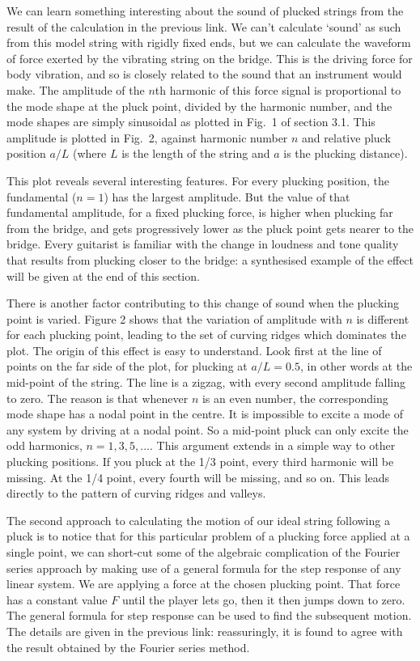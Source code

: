   We can learn something interesting about the sound of plucked strings from 
  the result of the calculation in the previous link. We can't calculate 
  `sound' as such from this model string with rigidly fixed ends, but we can 
  calculate the waveform of force exerted by the vibrating string on the 
  bridge. This is the driving force for body vibration, and so is closely 
  related to the sound that an instrument would make. The amplitude of the 
  $n$th harmonic of this force signal is proportional to the mode shape at the 
  pluck point, divided by the harmonic number, and the mode shapes are simply 
  sinusoidal as plotted in Fig.\ 1 of section 3.1. This amplitude is plotted in 
  Fig.\ 2, against harmonic number $n$ and relative pluck position $a/L$ (where 
  $L$ is the length of the string and $a$ is the plucking distance). 

  This plot reveals several interesting features. For every plucking position, 
  the fundamental ($n=1$) has the largest amplitude. But the value of that 
  fundamental amplitude, for a fixed plucking force, is higher when plucking 
  far from the bridge, and gets progressively lower as the pluck point gets 
  nearer to the bridge. Every guitarist is familiar with the change in loudness 
  and tone quality that results from plucking closer to the bridge: a 
  synthesised example of the effect will be given at the end of this section. 

  There is another factor contributing to this change of sound when the 
  plucking point is varied. Figure 2 shows that the variation of amplitude with 
  $n$ is different for each plucking point, leading to the set of curving 
  ridges which dominates the plot. The origin of this effect is easy to 
  understand. Look first at the line of points on the far side of the plot, for 
  plucking at $a/L=0.5$, in other words at the mid-point of the string. The 
  line is a zigzag, with every second amplitude falling to zero. The reason is 
  that whenever $n$ is an even number, the corresponding mode shape has a nodal 
  point in the centre. It is impossible to excite a mode of any system by 
  driving at a nodal point. So a mid-point pluck can only excite the odd 
  harmonics, $n=1,3,5,...$. This argument extends in a simple way to other 
  plucking positions. If you pluck at the 1/3 point, every third harmonic will 
  be missing. At the 1/4 point, every fourth will be missing, and so on. This 
  leads directly to the pattern of curving ridges and valleys. 

  The second approach to calculating the motion of our ideal string following a 
  pluck is to notice that for this particular problem of a plucking force 
  applied at a single point, we can short-cut some of the algebraic 
  complication of the Fourier series approach by making use of a general 
  formula for the step response of any linear system. We are applying a force 
  at the chosen plucking point. That force has a constant value $F$ until the 
  player lets go, then it then jumps down to zero. The general formula for step 
  response can be used to find the subsequent motion. The details are given in 
  the previous link: reassuringly, it is found to agree with the result 
  obtained by the Fourier series method. 

